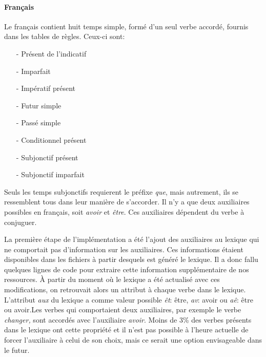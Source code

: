 \documentclass[11pt]{article} %
\begin{document}
\paragraph{Français}

Le français contient huit temps simple, formé d'un seul verbe accordé, fournis
dans les tables de règles. Ceux-ci sont:
\begin{itemize}
\item[-] Présent de l'indicatif
\item[-] Imparfait
\item[-] Impératif présent
\item[-] Futur simple
\item[-] Passé simple
\item[-] Conditionnel présent
\item[-] Subjonctif présent
\item[-] Subjonctif imparfait
\end{itemize}
Seuls les temps subjonctifs requierent le préfixe \emph{que}, 
mais autrement, ils se ressemblent tous dans leur manière de s'accorder. Il n'y 
a que deux auxiliaires possibles en français, soit \emph{avoir} et \emph{être}.
Ces auxiliaires dépendent du verbe à conjuguer.

La première étape de l'implémentation
a été l'ajout des auxiliaires au lexique qui ne comportait pas
d'information sur les auxiliaires. Ces informations
étaient disponibles dans les fichiers à partir desquels est généré
le lexique. Il a donc fallu quelques lignes de code pour extraire
cette information supplémentaire de nos ressources. À partir du moment
où le lexique a été actualisé avec ces modifications, on retrouvait
alors un attribut à chaque verbe dans le lexique. L'attribut \emph{aux
}du lexique a comme valeur possible \emph{êt}: être, \emph{av}: avoir
ou \emph{aê}: être ou avoir.Les verbes qui comportaient
deux auxiliaires, par exemple le verbe \emph{changer,} sont accordés
avec l'auxiliaire \emph{avoir}. Moins de 3\% des verbes présents dans le
lexique ont cette propriété et il n'est pas possible à l'heure actuelle
de forcer l'auxiliaire à celui de son choix, mais ce serait une option
envisageable dans le futur. 
\end{document}
